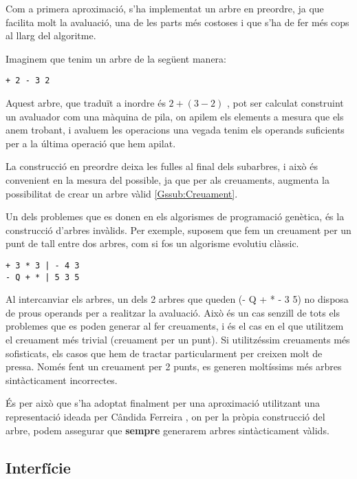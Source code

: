 Com a primera aproximació, s'ha implementat un arbre en preordre, ja que facilita
molt la avaluació, una de les parts més costoses i que s'ha de fer més cops al
llarg del algoritme.

Imaginem que tenim un arbre de la següent manera:

\begin{verbatim}
+ 2 - 3 2
\end{verbatim}

Aquest arbre, que traduït a inordre és $ 2 + (3 -2) $ , pot ser calculat
construint un avaluador com una màquina de pila, on apilem els elements a mesura
que els anem trobant, i avaluem les operacions una vegada tenim els operands
suficients per a la última operació que hem apilat.

La construcció en preordre deixa les fulles al final dels subarbres, i això és
convenient en la mesura del possible, ja que per als creuaments, augmenta la
possibilitat de crear un arbre vàlid \ref{Gssub:Creuament}.

Un dels problemes que es donen en els algorismes de programació genètica, és la
construcció d'arbres invàlids. Per exemple, suposem que fem un creuament per un
punt de tall entre dos arbres, com si fos un algorisme evolutiu clàssic.

\begin{verbatim}
+ 3 * 3 | - 4 3
- Q + * | 5 3 5
\end{verbatim}

Al intercanviar els arbres, un dels 2 arbres que queden (- Q + * - 3 5) no
disposa de prous operands per a realitzar la avaluació.  Això és un cas senzill
de tots els problemes que es poden generar al fer creuaments, i és el cas en el
que utilitzem el creuament més trivial (creuament per un punt). Si utilitzéssim
creuaments més sofisticats, els casos que hem de tractar particularment per
creixen molt de pressa.  Només fent un creuament per 2 punts, es generen
moltíssims més arbres sintàcticament incorrectes.

És per això que s'ha adoptat finalment per una aproximació utilitzant una
representació ideada per Cândida Ferreira \cite{ferreira:2007}, on per la pròpia
construcció del arbre, podem assegurar que \textbf{sempre} generarem arbres
sintàcticament vàlids.

\subsection{Interfície} %
\label{sub:Interficie}

